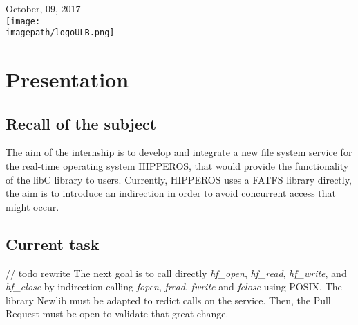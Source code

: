 \documentclass[12pt]{article}
\begin{document}
\begin{titlepage}

{\large October, 09, 2017 }\\[2cm] %



\texttt{[image: \\imagepath/logoULB.png]}\\[1cm] 
 

\vfill %

\end{titlepage}

\newpage


\pagestyle{fancy}
\fancyhf{}
\setlength\headheight{15pt}
\fancyhead[R]{}
\fancyfoot[R]{\thepage}

\newpage

\section{Presentation}
\subsection{Recall of the subject}
The aim of the internship is to develop and integrate a new file system 
service for the real-time operating system HIPPEROS, 
that would provide the functionality of the libC library to users.
Currently, HIPPEROS uses a FATFS library directly, the aim is to introduce an indirection in order to 
avoid concurrent access that might occur.

\subsection{Current task}
// todo rewrite
The next goal is to call directly \textit{hf\_open}, \textit{hf\_read},
\textit{hf\_write}, and \textit{hf\_close} by indirection calling 
\textit{fopen}, \textit{fread}, \textit{fwrite} and \textit{fclose} using 
POSIX. The library Newlib must be adapted to redict calls on the service.
Then, the Pull Request must be open to validate that great change.
\end{document}
